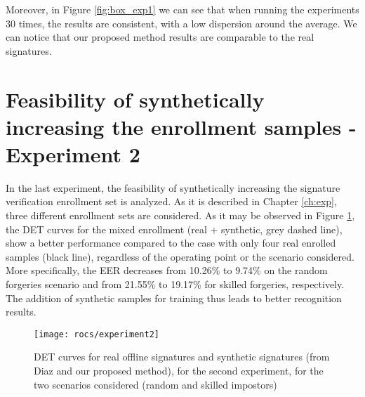Moreover, in Figure \ref{fig:box_exp1} we can see that when running the experiments 30 times, the results are consistent, with a low dispersion around the average. We can notice that our proposed method results are comparable to the real signatures.

\begin{figure*}[!htb]
\centering
\hspace*{0.2in} %
\hspace*{0.3in} %
\hspace*{0.2in} %
\caption{Boxplot comparison for running 30 times the Experiment 1 - mono-session scenario and multi-session. (a) mono-session scenario, random forgeries, (b) mono-session scenario, skilled forgeries, (c) multi-session scenario, random forgeries, (d) multi-session scenario, skilled forgeries. } \label{fig:box_exp1}
\end{figure*}

\section{Feasibility of synthetically increasing the enrollment samples - Experiment 2}
In the last experiment, the feasibility of synthetically
increasing the signature verification enrollment set is analyzed. As it is described in
Chapter \ref{ch:exp}, three different enrollment sets are considered. As it
may be observed in Figure \ref{fig:exp2}, the DET curves for the
mixed enrollment (real + synthetic, grey dashed line), show a
better performance compared to the case with only four real
enrolled samples (black line), regardless of the operating point or the scenario considered. More specifically, the EER decreases from 10.26\% to 9.74\% on the random forgeries scenario and from 21.55\% to 19.17\% for skilled forgeries, respectively. The addition of synthetic samples for training thus leads to better recognition results.
\begin{figure}[!htb]
	\centering
	

	\texttt{[image: rocs/experiment2]}
	\caption{DET curves for real offline signatures and synthetic signatures (from Diaz and our proposed method), for the second experiment, for the two scenarios considered (random and skilled impostors)}
	\label{fig:exp2}
\end{figure}


